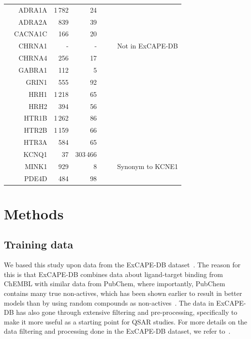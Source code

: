 \documentclass[utf8]{frontiersSCNS} %
\begin{document}
\begin{table}[p]
\begin{tabular}{crrrrcl}
&    ADRA1A  &       1\,782  &       24          &            &       &       \\
&    ADRA2A  &       839     &       39          &            &       &       \\
&    CACNA1C &       166     &       20          &            &       &       \\
&    CHRNA1  &       -       &       -           &            &       & Not in ExCAPE-DB \\
&    CHRNA4  &       256     &       17          &            &       &       \\
&    GABRA1  &       112     &       5           &            &       &       \\
&    GRIN1   &       555     &       92          &            &       &       \\
&    HRH1    &       1\,218  &       65          &            &       &       \\
&    HRH2    &       394     &       56          &            &       &       \\
&    HTR1B   &       1\,262  &       86          &            &       &       \\
&    HTR2B   &       1\,159  &       66          &            &       &       \\
&    HTR3A   &       584     &       65          &            &       &       \\
&    KCNQ1   &       37      &       303\,466    &            &       &       \\
&    MINK1   &       929     &       8           &            &       & Synonym to KCNE1 \\
&    PDE4D   &       484     &       98          &            &       &       \\

\bottomrule
\end{tabular}
\end{table}

\section{Methods} \label{Methods}

\subsection{Training data} \label{Training data}

We based this study upon data from the ExCAPE-DB dataset~\cite{Sun2017}. The
reason for this is that ExCAPE-DB combines data about ligand-target binding
from ChEMBL with similar data from PubChem, where importantly, PubChem
contains many true non-actives, which has been shown earlier to result in
better models than by using random compounds as
non-actives~\cite{Mervin2015}. The data in ExCAPE-DB has also gone through
extensive filtering and pre-processing, specifically to make it more useful
as a starting point for QSAR studies. For more details on the data filtering
and processing done in the ExCAPE-DB dataset, we refer to~\cite{Sun2017}.
\end{document}
